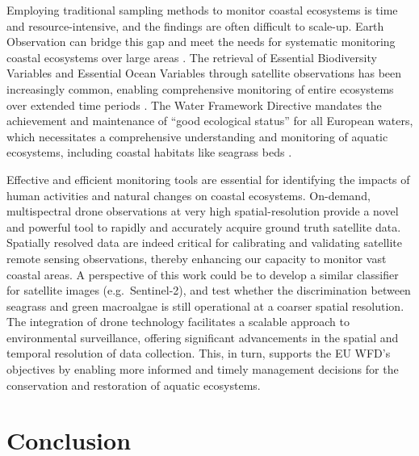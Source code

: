 \documentclass[
  number]{elsarticle}
\begin{document}
Employing traditional sampling methods to monitor coastal ecosystems is
time and resource-intensive, and the findings are often difficult to
scale-up. Earth Observation can bridge this gap and meet the needs for
systematic monitoring coastal ecosystems over large areas
\citep{papathanasopoulou2019satellite}. The retrieval of Essential
Biodiversity Variables and Essential Ocean Variables through satellite
observations has been increasingly common, enabling comprehensive
monitoring of entire ecosystems over extended time periods
\citetext{\citealp[ ]{ratnarajah2023monitoring}; \citealp{Zoffoli2021}}.
The Water Framework Directive \citep{WFD2000} mandates the achievement
and maintenance of ``good ecological status'' for all European waters,
which necessitates a comprehensive understanding and monitoring of
aquatic ecosystems, including coastal habitats like seagrass beds
\citetext{\citealp[ ]{foden2007angiosperms}; \citealp[
]{nordlund2024one}; \citealp{Zoffoli2021}}.

Effective and efficient monitoring tools are essential for identifying
the impacts of human activities and natural changes on coastal
ecosystems. On-demand, multispectral drone observations at very high
spatial-resolution provide a novel and powerful tool to rapidly and
accurately acquire ground truth satellite data. Spatially resolved data
are indeed critical for calibrating and validating satellite remote
sensing observations, thereby enhancing our capacity to monitor vast
coastal areas. A perspective of this work could be to develop a similar
classifier for satellite images (e.g.~Sentinel-2), and test whether the
discrimination between seagrass and green macroalgae is still
operational at a coarser spatial resolution. The integration of drone
technology facilitates a scalable approach to environmental
surveillance, offering significant advancements in the spatial and
temporal resolution of data collection. This, in turn, supports the EU
WFD's objectives by enabling more informed and timely management
decisions for the conservation and restoration of aquatic ecosystems.

\section{Conclusion}\label{conclusion}
\end{document}

